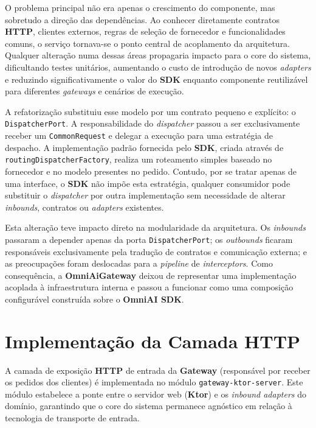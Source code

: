 O problema principal não era apenas o crescimento do componente, mas sobretudo a direção das dependências. Ao conhecer diretamente contratos \textbf{HTTP}, clientes externos, regras de seleção de fornecedor e funcionalidades comuns, o serviço tornava-se o ponto central de acoplamento da arquitetura. Qualquer alteração numa dessas áreas propagaria impacto para o core do sistema, dificultando testes unitários, aumentando o custo de introdução de novos \textit{adapters} e reduzindo significativamente o valor do \textbf{SDK} enquanto componente reutilizável para diferentes \textit{gateways} e cenários de execução.

A refatorização substituiu esse modelo por um contrato pequeno e explícito: o \texttt{DispatcherPort}. A responsabilidade do \textit{dispatcher} passou a ser exclusivamente receber um \texttt{CommonRequest} e delegar a execução para uma estratégia de despacho. A implementação padrão fornecida pelo \textbf{SDK}, criada através de \texttt{routingDispatcherFactory}, realiza um roteamento simples baseado no fornecedor e no modelo presentes no pedido. Contudo, por se tratar apenas de uma interface, o \textbf{SDK} não impõe esta estratégia, qualquer consumidor pode substituir o \textit{dispatcher} por outra implementação sem necessidade de alterar \textit{inbounds}, contratos ou \textit{adapters} existentes.

Esta alteração teve impacto direto na modularidade da arquitetura. Os \textit{inbounds} passaram a depender apenas da porta \texttt{DispatcherPort}; os \textit{outbounds} ficaram responsáveis exclusivamente pela tradução de contratos e comunicação externa; e as preocupações  foram deslocadas para a \textit{pipeline} de \textit{interceptors}. Como consequência, a \textbf{OmniAiGateway} deixou de representar uma implementação acoplada à infraestrutura interna e passou a funcionar como uma composição configurável construída sobre o \textbf{OmniAI SDK}.

    \section{Implementação da Camada HTTP}
    \label{sec:gateway-ktor-server}

    A camada de exposição \textbf{HTTP} de entrada da \textbf{Gateway} (responsável por receber os pedidos dos clientes) é implementada no módulo \texttt{gateway-ktor-server}. Este módulo estabelece a ponte entre o servidor web (\textbf{Ktor}) e os \textit{inbound adapters} do domínio, garantindo que o core do sistema permanece agnóstico em relação à tecnologia de transporte de entrada.

